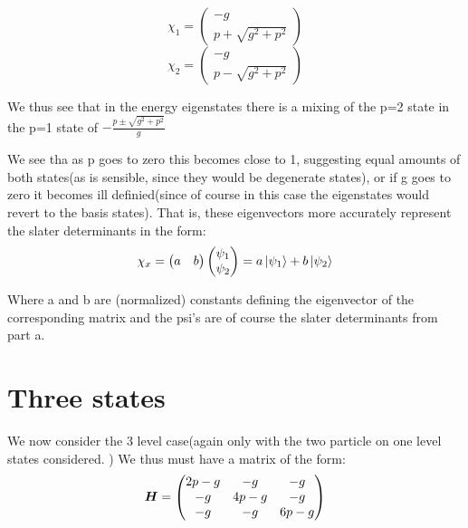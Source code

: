 \documentclass[11pt]{article} %
\begin{document}
\begin{equation}
\chi_1 =\left( \begin{matrix} -g \\ p+\sqrt{g^2+p^2}\end{matrix}\right)
\end{equation}
\begin{equation}
\chi_2 =\left( \begin{matrix} -g \\ p-\sqrt{g^2+p^2}\end{matrix}\right)
\end{equation}

We thus see that in the energy eigenstates there is a mixing of the p=2 state in the p=1 state of $-\frac{p\pm\sqrt{g^2+p^2}}{g}$

We see tha as p goes to zero this becomes close to 1, suggesting equal amounts of both states(as is sensible, since they would be degenerate states), or if g goes to zero it becomes ill definied(since of course in this case the eigenstates would revert to the basis states). That is, these eigenvectors more accurately represent the slater determinants in the form:\\

\begin{equation}
\chi_x=\left( \begin {matrix} a & b \end{matrix} \right)\left(\begin{matrix} \psi_1 \\ \psi_2 \end{matrix} \right)=a\ket{\psi_1}+b\ket{\psi_2}
\end{equation}

Where a and b are (normalized) constants defining the eigenvector of the corresponding matrix and the psi's are of course the slater determinants from part a.
\section{Three states}

We now consider the 3 level case(again only with the two particle on one level states considered. ) We thus must have a matrix of the form:\\

\begin{equation}
\matrixsym{H}=\left(\begin{matrix} 2p-g & -g & -g \\  -g & 4p-g & -g \\ -g & -g & 6p-g \end{matrix} \right)
\end{equation}
\end{document}
